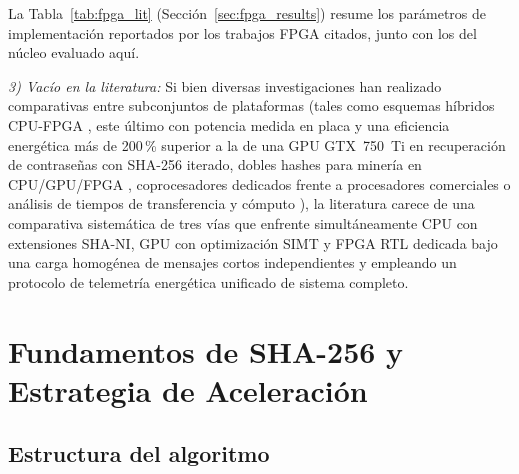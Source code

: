 \documentclass[conference]{IEEEtran}
\begin{document}
La Tabla~\ref{tab:fpga_lit} (Sección~\ref{sec:fpga_results}) resume los parámetros de implementación reportados por los trabajos FPGA citados, junto con los del núcleo evaluado aquí.

\textit{3) Vacío en la literatura:} Si bien diversas investigaciones han realizado comparativas entre subconjuntos de plataformas (tales como esquemas híbridos CPU-FPGA \cite{zhang2020hybrid, liu2019energy}, este último con potencia medida en placa y una eficiencia energética más de 200\,\% superior a la de una GPU GTX~750~Ti en recuperación de contraseñas con SHA-256 iterado, dobles hashes para minería en CPU/GPU/FPGA \cite{pham2020double}, coprocesadores dedicados frente a procesadores comerciales \cite{pham2026cryptorv} o análisis de tiempos de transferencia y cómputo \cite{gaspar2014jrc}), la literatura carece de una comparativa sistemática de tres vías que enfrente simultáneamente CPU con extensiones SHA-NI, GPU con optimización SIMT y FPGA RTL dedicada bajo una carga homogénea de mensajes cortos independientes y empleando un protocolo de telemetría energética unificado de sistema completo.

\section{Fundamentos de SHA-256 y Estrategia de Aceleración}
\label{sec:sha_background}

\subsection{Estructura del algoritmo}
\end{document}

